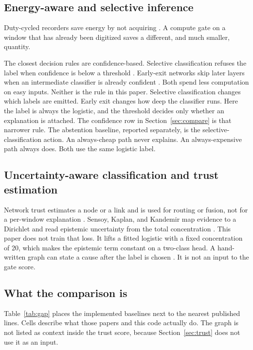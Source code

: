 \documentclass[sn-mathphys-num]{sn-jnl}%
\theoremstyle{thmstyleone}%
\theoremstyle{thmstyletwo}%
\theoremstyle{thmstylethree}%
\begin{document}
\subsection{Energy-aware and selective inference}\label{sec:rw-energy}

Duty-cycled recorders save energy by not acquiring \cite{wiggins2007,wiggins2023,vanparijs2009,baumgartner2019}. A compute gate on a window that has already been digitized saves a different, and much smaller, quantity.

The closest decision rules are confidence-based. Selective classification refuses the label when confidence is below a threshold \cite{geifman2017}. Early-exit networks skip later layers when an intermediate classifier is already confident \cite{teerapittayanon2016}. Both spend less computation on easy inputs. Neither is the rule in this paper. Selective classification changes which labels are emitted. Early exit changes how deep the classifier runs. Here the label is always the logistic, and the threshold decides only whether an explanation is attached. The confidence row in Section~\ref{sec:compare} is that narrower rule. The abstention baseline, reported separately, is the selective-classification action. An always-cheap path never explains. An always-expensive path always does. Both use the same logistic label.

\subsection{Uncertainty-aware classification and trust estimation}\label{sec:rw-uncertainty}

Network trust estimates a node or a link and is used for routing or fusion, not for a per-window explanation \cite{signori2022,song2025,he2024,xia2026}. Sensoy, Kaplan, and Kandemir map evidence to a Dirichlet and read epistemic uncertainty from the total concentration \cite{sensoy2018}. This paper does not train that loss. It lifts a fitted logistic with a fixed concentration of 20, which makes the epistemic term constant on a two-class head. A hand-written graph can state a cause after the label is chosen \cite{traer2021,olvera2025,dung1995}. It is not an input to the gate score.

\subsection{What the comparison is}\label{sec:novelty}

Table~\ref{tab:gap} places the implemented baselines next to the nearest published lines. Cells describe what those papers and this code actually do. The graph is not listed as context inside the trust score, because Section~\ref{sec:trust} does not use it as an input.
\end{document}
